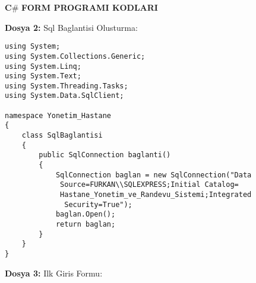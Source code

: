 \textbf{C}\# \textbf{FORM PROGRAMI KODLARI}

\textbf{Dosya 2:} Sql Baglantisi Olusturma:

\begin{lstlisting}
using System;
using System.Collections.Generic;
using System.Linq;
using System.Text;
using System.Threading.Tasks;
using System.Data.SqlClient;

namespace Yonetim_Hastane
{
    class SqlBaglantisi
    {
        public SqlConnection baglanti()
        {
            SqlConnection baglan = new SqlConnection("Data
             Source=FURKAN\\SQLEXPRESS;Initial Catalog=
             Hastane_Yonetim_ve_Randevu_Sistemi;Integrated
              Security=True");
            baglan.Open();
            return baglan;
        }
    }
}
\end{lstlisting}

\textbf{Dosya 3:} Ilk Giris Formu:

